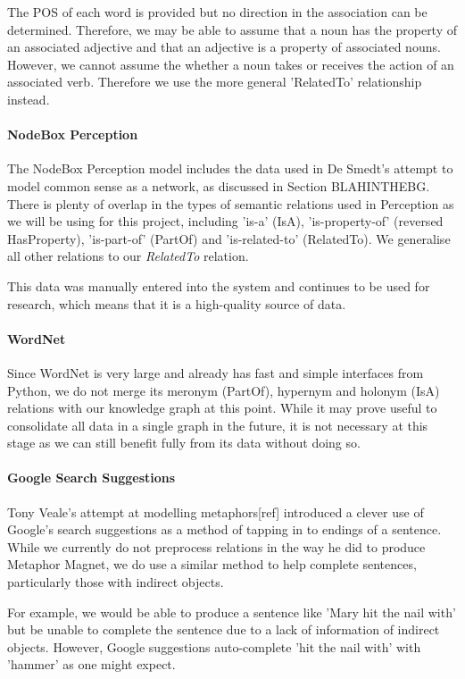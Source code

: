 The POS of each word is provided but no direction in the association can be determined. Therefore, we may be able to assume that a noun has the property of an associated adjective and that an adjective is a property of associated nouns. However, we cannot assume the whether a noun takes or receives the action of an associated verb. Therefore we use the more general 'RelatedTo' relationship instead.

\paragraph{NodeBox Perception}
The NodeBox Perception model includes the data used in De Smedt's attempt to model common sense as a network, as discussed in Section BLAHINTHEBG. There is plenty of overlap in the types of semantic relations used in Perception as we will be using for this project, including 'is-a' (IsA), 'is-property-of' (reversed HasProperty), 'is-part-of' (PartOf) and 'is-related-to' (RelatedTo). We generalise all other relations to our \textit{RelatedTo} relation.

This data was manually entered into the system and continues to be used for research, which means that it is a high-quality source of data.

\paragraph{WordNet}
Since WordNet is very large and already has fast and simple interfaces from Python, we do not merge its meronym (PartOf), hypernym and holonym (IsA) relations with our knowledge graph at this point. While it may prove useful to consolidate all data in a single graph in the future, it is not necessary at this stage as we can still benefit fully from its data without doing so.


\paragraph{Google Search Suggestions}
Tony Veale's attempt at modelling metaphors[ref] introduced a clever use of Google's search suggestions as a method of tapping in to endings of a sentence. While we currently do not preprocess relations in the way he did to produce Metaphor Magnet, we do use a similar method to help complete sentences, particularly those with indirect objects. 

For example, we would be able to produce a sentence like 'Mary hit the nail with' but be unable to complete the sentence due to a lack of information of indirect objects. However, Google suggestions auto-complete 'hit the nail with' with 'hammer' as one might expect. 

